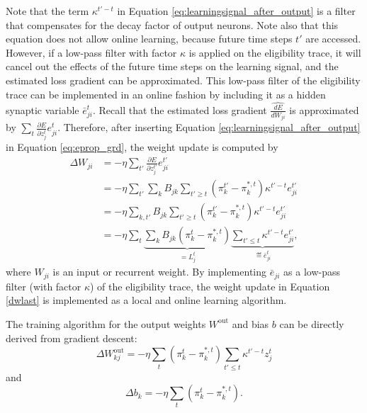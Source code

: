             Note that the term $\kappa^{t'-t}$ in Equation \ref{eq:learningsignal_after_output} is a filter that compensates for the decay factor of output neurons.
            Note also that this equation does not allow online learning, because future time steps $t'$ are accessed.
            However, if a low-pass filter with factor $\kappa$ is applied on the eligibility trace, it will cancel out the effects of the future time steps on the learning signal, and the estimated loss gradient can be approximated.
            This low-pass filter of the eligibility trace can be implemented in an online fashion by including it as a hidden synaptic variable $\bar{e}^t_{ji}$.
            Recall that the estimated loss gradient $\widehat{\frac{dE}{dW_{ji}}}$ is approximated by $\sum_t \frac{\partial E}{\partial z^t_j}e^t_{ji}$.
            Therefore, after inserting Equation \ref{eq:learningsignal_after_output} in Equation \ref{eq:eprop_grd}, the weight update is computed by
            \begin{align}
            \Delta W_{ji} &= -\eta\sum_{t'}\frac{\partial E}{\partial z^{t'}_j}e^{t'}_{ji}\\
            &= -\eta\sum_{t'}\sum_kB_{jk}\sum_{t'\geq t}\left(\pi^{t'}_k - \pi^{*,t}_k\right)\kappa^{t'-t}e^{t'}_{ji}\\
            &= -\eta\sum_{k, t'}B_{jk}\sum_{t'\geq t}\left(\pi^{t'}_k - \pi^{*,t}_k\right)\kappa^{t'-t}e^{t'}_{ji}\\
            &= -\eta\sum_t\underbrace{\sum_kB_{jk}\left(\pi^{t}_k - \pi^{*,t}_k\right)}_{=L^t_j}\underbrace{\sum_{t'\leq t}\kappa^{t'-t}e^{t'}_{ji}}_{\eqdef \bar{e}^t_{ji}}\label{dwlast},
            \end{align}
            where $W_{ji}$ is an input or recurrent weight.
            By implementing $\bar{e}_{ji}$ as a low-pass filter (with factor $\kappa$) of the eligibility trace, the weight update in Equation \ref{dwlast} is implemented as a local and online learning algorithm.

            The training algorithm for the output weights $W^\text{out}$ and bias $b$ can be directly derived from gradient descent:
            \begin{equation}
            \Delta W^\text{out}_{kj} = -\eta \sum_t\left(\pi^t_k - \pi^{*,t}_k\right)\sum_{t'\leq t}\kappa^{t'-t}z^t_j
            \end{equation}
            and
            \begin{equation}
            \Delta b_k = -\eta \sum_t\left(\pi^t_k - \pi^{*,t}_k\right).
            \end{equation}


